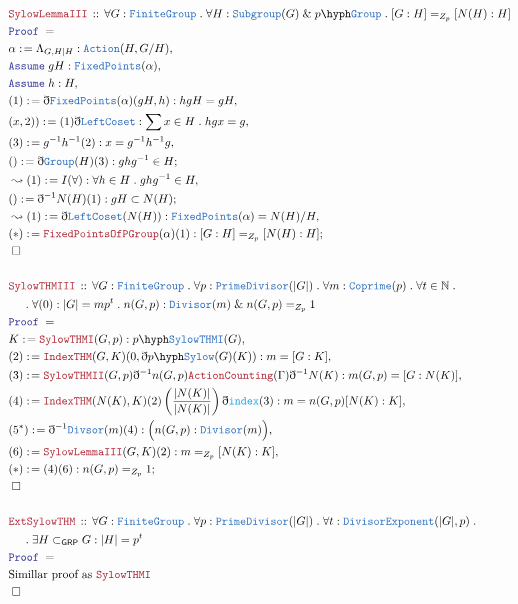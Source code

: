 \documentclass[12pt]{scrartcl}
\newcommand{\TYPE}[1]{\textcolor{NavyBlue}{\mathtt{#1}}}
\newcommand{\FUNC}[1]{\textcolor{Cerulean}{\mathtt{#1}}}
\newcommand{\LOGIC}[1]{\textcolor{Blue}{\mathtt{#1}}}
\newcommand{\THM}[1]{\textcolor{Maroon}{\mathtt{#1}}}
\renewcommand{\.}{\; . \;}
\newcommand{\de}{: \kern 0.1pc =}
\newcommand{\Theorem}[2]{& \THM{#1} \, :: \, #2 \\ & \Proof = \\ }
\newcommand{\NewLine}{\\ & \kern 1pc}
\newcommand{\Page}[1]{ \begin{align*} #1 \end{align*}   }
\newcommand{ \bd }{ \ByDef }
\renewcommand{\And}{\; \& \;}
\newcommand{\Nat}{\mathbb{N} }
\newcommand{\Say}[3]{& #1 \de #2 : #3, \\}
\newcommand{\Conclude}[3]{& #1 \de #2 : #3; \\}
\newcommand{\Derive}[3]{& \leadsto #1 \de #2 : #3, \\}
\newcommand{\Assume}[2]{& \LOGIC{Assume} \; #1 : #2, \\}
\newcommand{\QED}{\; \square}
\newcommand{\EndProof}{& \QED \\}
\newcommand{\ByDef}{\eth}
\newcommand{\Proof}{\LOGIC{Proof} \; }
\newcommand{\Sgrp}{\subset_{\mathsf{GRP}}}
\newcommand{\FG}{\TYPE{FiniteGroup}}
\begin{document}
\Page{
	\Theorem{SylowLemmaIII}{\forall G : \FG \. \forall H : \TYPE{Subgroup}(G) \And p\hyph\TYPE{Group} \. 
		[G:H] =_{Z_p} [N(H) : H]
	}
	\Say{\alpha}{\Lambda_{G,H|H}}{\TYPE{Action}(H, G/H)}
	\Assume{gH}{\TYPE{FixedPoints}(\alpha)}
	\Assume{h}{H}
	\Say{(1)}{\bd \TYPE{FixedPoints}(\alpha)(gH,h)}{hgH = gH}
	\Say{(x,2))}{(1)\bd \TYPE{LeftCoset}}{\sum x \in H \. hgx = g}
	\Say{(3)}{g^{-1}h^{-1}(2)}{x = g^{-1}h^{-1}g}
	\Conclude{()}{\bd \TYPE{Group}(H)(3)}{ ghg^{-1} \in H}
	\Derive{(1)}{I(\forall)}{ \forall h \in H \. ghg^{-1} \in H}
	\Conclude{()}{\bd^{-1} N(H)(1)}{gH \subset N(H)} 
	\Derive{(1)}{\bd \TYPE{LeftCoset}(N(H))}{\TYPE{FixedPoints}(\alpha) = N(H)/H}
	\Conclude{(*)}{\THM{FixedPointsOfPGroup}(\alpha)(1)}{ [G : H] =_{Z_p} [N(H) : H]    }
	\EndProof
	\\
	\Theorem{SylowTHMIII}{\forall G : \FG \. \forall p : \TYPE{PrimeDivisor}(|G|) \. 
		\forall m : \TYPE{Coprime}(p) \. \forall t \in \Nat \. \NewLine \.\forall (0) : |G| = mp^t \.
		n(G,p) : \TYPE{Divisor}(m) \And n(G,p) =_{Z_p} 1
	}
	\Say{K}{\THM{SylowTHMI}(G,p)}{p\hyph\TYPE{SylowTHMI}(G)}
	\Say{(2)}{  \THM{IndexTHM}(G,K)(0,\bd p\hyph\TYPE{Sylow}(G)(K))}
	{ m = [G : K]   }
	\Say{(3)}{ \THM{SylowTHMII}(G,p)\bd^{-1} n(G,p) \THM{ActionCounting}(\Gamma)\bd^{-1} N(K)}
	{ m(G,p) = [G:N(K)]  }
	\Say{(4)}{ \THM{IndexTHM}(N(K),K)(2)\left( \frac{|N(K)|}{|N(K)|} \right) \bd \FUNC{index}(3) }{ m = n(G,p) [N(K) : K]}
	\Say{(5^*)}{ \bd^{-1} \TYPE{Divsor}(m)(4)  }{\Big( n(G,p) : \TYPE{Divisor}(m) \Big)}
	\Say{(6)}{\THM{SylowLemmaIII}(G,K)(2)}{m =_{Z_p} [N(K) : K] }
	\Conclude{(*)}{(4)(6)}{n(G,p) =_{Z_p} 1}
	\EndProof
	\\
	\Theorem{ExtSylowTHM}{\forall G : \FG \. \forall p : \TYPE{PrimeDivisor}(|G|) \. \forall t : \TYPE{DivisorExponent}(|G|,p)
		\.  
		\NewLine \.
		\exists H \Sgrp G : |H| = p^t   }
	&  \text{Simillar proof as $\THM{SylowTHMI}$} \\
	\EndProof
	\\
}
\end{document}
